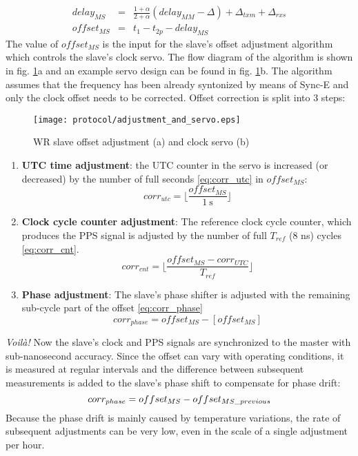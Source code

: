 \begin{eqnarray}
\label{eq:delaymm_full_3}delay_{MS} & = & \frac{1+\alpha}{2+\alpha} (delay_{MM}
- \Delta) + \Delta_{txm} + \Delta_{rxs} \\
\label{eq:offset_ms} offset_{MS} & = & t_{1} - t_{2p} - delay_{MS}
\end{eqnarray}
The value of $offset_{MS}$ is the input for the slave's offset adjustment
algorithm which controls the slave's clock servo. The flow diagram of the
algorithm is shown in fig. \ref{fig:adjustment_and_servo}a and an example
servo design can be found in fig. \ref{fig:adjustment_and_servo}b. The
algorithm assumes that the frequency has been already syntonized by means
of Sync-E and only the clock offset needs to be corrected. Offset correction
is split into 3 steps:
\begin{figure}[ht!]
  \centering
  \texttt{[image: protocol/adjustment\_and\_servo.eps]}
  \caption{WR slave offset adjustment (a) and clock servo (b)}
  \label{fig:adjustment_and_servo}
\end{figure}
\begin{enumerate}
\item \textbf{UTC time adjustment}: the UTC counter in the servo is
increased (or decreased) by the number of full seconds \ref{eq:corr_utc}
in $offset_{MS}$:
\begin{equation}
corr_{utc} = \lfloor{\frac{offset_{MS}}{1 \mathrm{~s}}}\rfloor
\label{eq:corr_utc}
\end{equation}
\item \textbf{Clock cycle counter adjustment}: The reference clock cycle
counter, which produces the PPS signal is adjusted by the number of full
$T_{ref}$ (8 ns) cycles \ref{eq:corr_cnt}.
\begin{equation}
corr_{cnt} = \lfloor \frac{offset_{MS} - corr_{UTC}}{T_{ref}}\rfloor
\label{eq:corr_cnt}
\end{equation}
\item \textbf{Phase adjustment}: The slave's phase shifter is adjusted with
the remaining sub-cycle part of the offset \ref{eq:corr_phase}
\begin{equation}
corr_{phase} = offset_{MS} - [offset_{MS}]
\label{eq:corr_phase}
\end{equation}
\end{enumerate}
\emph{Voil\`{a}!} Now the slave's clock and PPS signals are synchronized to the
master with sub-nanosecond accuracy. Since the offset can vary with operating
conditions, it is measured at regular intervals and the difference between
subsequent measurements is added to the slave's phase shift to compensate for
phase drift:
\begin{equation}
corr_{phase} = offset_{MS} - offset_{MS\us previous}
\label{eq:corr_phase2}
\end{equation}
Because the phase drift is mainly caused by temperature variations, the rate
of subsequent adjustments can be very low, even in the scale of a single
adjustment per hour.

